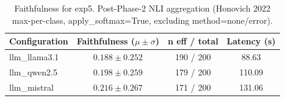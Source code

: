 \begin{table}[htbp]
\centering
\caption{Faithfulness for exp5. Post-Phase-2 NLI aggregation (Honovich 2022 max-per-class, apply\_softmax=True, excluding method=none/error).}
\label{tab:exp5-faithfulness-phase3}
\begin{tabular}{lccc}
\toprule
Configuration & Faithfulness ($\mu \pm \sigma$) & n eff / total & Latency (s) \\
\midrule
llm\_llama3.1 & $0.188 \pm 0.252$ & 190 / 200 & 88.63 \\
llm\_qwen2.5 & $0.198 \pm 0.259$ & 179 / 200 & 110.09 \\
llm\_mistral & $0.216 \pm 0.267$ & 171 / 200 & 131.06 \\
\bottomrule
\end{tabular}
\end{table}
